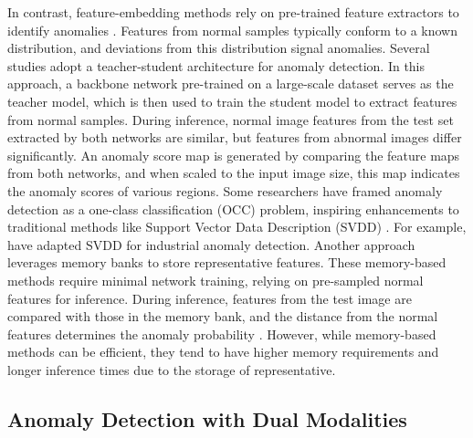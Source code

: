 In contrast, feature-embedding methods rely on pre-trained feature extractors to identify anomalies \cite{rudolph2021same, wang2021student}. Features from normal samples typically conform to a known distribution, and deviations from this distribution signal anomalies. Several studies \cite{bergmann2020uninformed, salehi2021multiresolution, wang2021student, cao2022informative} adopt a teacher-student architecture for anomaly detection. In this approach, a backbone network pre-trained on a large-scale dataset serves as the teacher model, which is then used to train the student model to extract features from normal samples. During inference, normal image features from the test set extracted by both networks are similar, but features from abnormal images differ significantly. An anomaly score map is generated by comparing the feature maps from both networks, and when scaled to the input image size, this map indicates the anomaly scores of various regions. Some researchers have framed anomaly detection as a one-class classification (OCC) problem, inspiring enhancements to traditional methods like Support Vector Data Description (SVDD) \cite{tax2004support, defard2021padim}. For example, \cite{yi2021patch, zhang2021anomaly, hu2021semantic} have adapted SVDD for industrial anomaly detection. Another approach leverages memory banks \cite{cohen2020sub, li2021anomaly, wan2021industrial, roth2022towards} to store representative features. These memory-based methods require minimal network training, relying on pre-sampled normal features for inference. During inference, features from the test image are compared with those in the memory bank, and the distance from the normal features determines the anomaly probability \cite{lee2022cfa, kim2023fapm, defard2021padim}. However, while memory-based methods can be efficient, they tend to have higher memory requirements and longer inference times due to the storage of representative.

\subsection*{Anomaly Detection with Dual Modalities}

